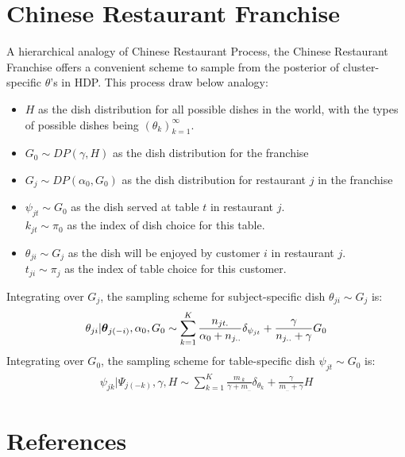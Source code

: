 \documentclass{article} %
\begin{document}
\section{Chinese Restaurant Franchise}\label{sec:CRF}
A hierarchical analogy of Chinese Restaurant Process, the Chinese Restaurant Franchise offers a convenient scheme to sample from the posterior of cluster-specific $\theta$'s in HDP. This process draw below analogy:
\begin{itemize}
\item $H$ as the dish distribution for all possible dishes in the world, with the types of possible dishes being $(\theta_k)_{k=1}^\infty$.
\item  $G_0 \sim DP(\gamma, H)$ as the dish distribution for the franchise
\item $G_j \sim DP(\alpha_0, G_0)$ as the dish distribution for restaurant $j$ in the franchise
\item $\psi_{jt} \sim G_0$ as the dish served at table $t$ in restaurant $j$.\\ $k_{jt} \sim \pi_0$ as the index of dish choice for this table.
\item $\theta_{ji} \sim G_j$ as the dish will be enjoyed by customer $i$ in restaurant $j$. \\
$t_{ji} \sim \pi_j$ as the index of table choice for this customer.
\end{itemize}
Integrating over $G_j$, the sampling scheme for subject-specific dish $\theta_{ji} \sim G_j$ is:
\begin{align*}
\theta_{ji} | \boldsymbol{\theta}_{j(-i)}, \alpha_0, G_0 \sim 
\sum_{k=1}^K \frac{n_{jt.}}{\alpha_0 + n_{j..}} \delta_{\psi_{jt}} + 
\frac{\gamma}{n_{j..} + \gamma} G_0
\end{align*}
Integrating over $G_0$, the sampling scheme for table-specific dish $\psi_{jt} \sim G_0$ is:
\begin{align*}
\psi_{jk} | \Psi_{j(-k)}, \gamma, H \sim 
\sum_{k=1}^K \frac{m_{.k}}{\gamma + m_{..}} \delta_{\theta_{k}} + 
\frac{\gamma}{m_{..} + \gamma} H
\end{align*}


\clearpage
\section{References}


\end{document}
